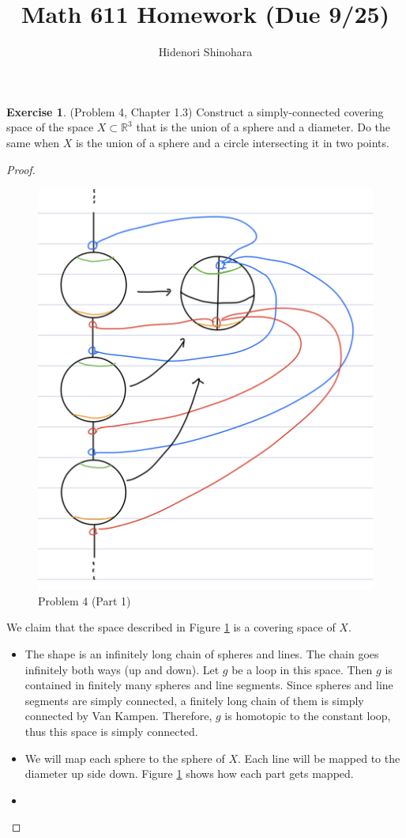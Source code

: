 \documentclass[12pt, psamsfonts]{amsart}
\theoremstyle{definition}
\newtheorem*{exer}{Exercise}
\theoremstyle{remark}
\numberwithin{equation}{section}
\begin{document}
\title{Math 611 Homework (Due 9/25)}
\author{Hidenori Shinohara}
\maketitle

\begin{exer}{(Problem 4, Chapter 1.3)}
  Construct a simply-connected covering space of the space $X \subset \mathbb{R}^3$ that is the union of a sphere and a diameter.
  Do the same when $X$ is the union of a sphere and a circle intersecting it in two points.
\end{exer}

\begin{proof}
  \begin{figure}
    \includegraphics[width=.5\linewidth]{problem4-1.jpeg}
    \caption{Problem 4 (Part 1)}
    \label{fig:prob4_1}
  \end{figure}
  We claim that the space described in Figure \ref{fig:prob4_1} is a covering space of $X$.
  \begin{itemize}
    \item
      The shape is an infinitely long chain of spheres and lines.
      The chain goes infinitely both ways (up and down).
      Let $g$ be a loop in this space.
      Then $g$ is contained in finitely many spheres and line segments.
      Since spheres and line segments are simply connected, a finitely long chain of them is simply connected by Van Kampen.
      Therefore, $g$ is homotopic to the constant loop, thus this space is simply connected.
    \item
      We will map each sphere to the sphere of $X$.
      Each line will be mapped to the diameter up side down.
      Figure \ref{fig:prob4_1} shows how each part gets mapped.
    \item

\end{itemize}
\end{proof}
\end{document}
